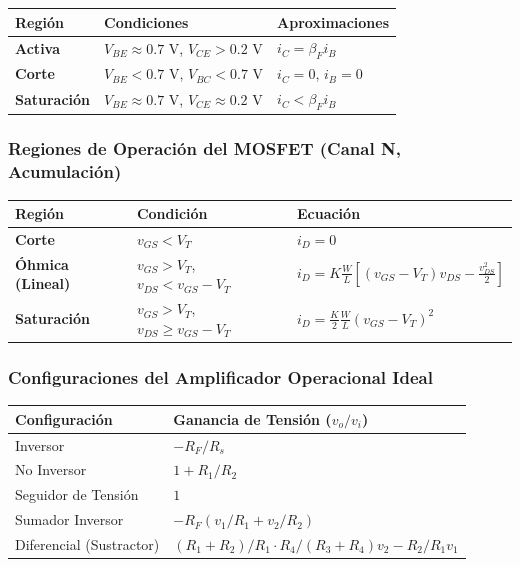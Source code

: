 \documentclass[11pt,a4paper]{article}
\begin{document}
\begin{center}
\begin{tabular}{@{}lll@{}}
\toprule
Región & Condiciones & Aproximaciones \\
\midrule
\textbf{Activa} & $V_{BE} \approx 0.7\text{ V}$, $V_{CE} > 0.2\text{ V}$ & $i_C = \beta_F i_B$ \\
\textbf{Corte} & $V_{BE} < 0.7\text{ V}$, $V_{BC} < 0.7\text{ V}$ & $i_C = 0$, $i_B = 0$ \\
\textbf{Saturación} & $V_{BE} \approx 0.7\text{ V}$, $V_{CE} \approx 0.2\text{ V}$ & $i_C < \beta_F i_B$ \\
\bottomrule
\end{tabular}
\end{center}



\subsubsection*{Regiones de Operación del MOSFET (Canal N, Acumulación)}


\begin{center}
\begin{tabular}{@{}lll@{}}
\toprule
Región & Condición & Ecuación \\
\midrule
\textbf{Corte} & $v_{GS} < V_T$ & $i_D = 0$ \\
\textbf{Óhmica (Lineal)} & $v_{GS} > V_T$, $v_{DS} < v_{GS} - V_T$ & $i_D = K \frac{W}{L}[(v_{GS}-V_T)v_{DS} - \frac{v_{DS}^2}{2}]$ \\
\textbf{Saturación} & $v_{GS} > V_T$, $v_{DS} \ge v_{GS} - V_T$ & $i_D = \frac{K}{2}\frac{W}{L}(v_{GS}-V_T)^2$ \\
\bottomrule
\end{tabular}
\end{center}



\subsubsection*{Configuraciones del Amplificador Operacional Ideal}


\begin{center}
\begin{tabular}{@{}ll@{}}
\toprule
Configuración & Ganancia de Tensión ($v_o/v_i$) \\
\midrule
Inversor & $-R_F / R_s$ \\
No Inversor & $1 + R_1 / R_2$ \\
Seguidor de Tensión & $1$ \\
Sumador Inversor & $-R_F (v_1/R_1 + v_2/R_2)$ \\
Diferencial (Sustractor) & $(R_1+R_2)/R_1 \cdot R_4/(R_3+R_4) v_2 - R_2/R_1 v_1$ \\
\bottomrule
\end{tabular}
\end{center}
\end{document}

